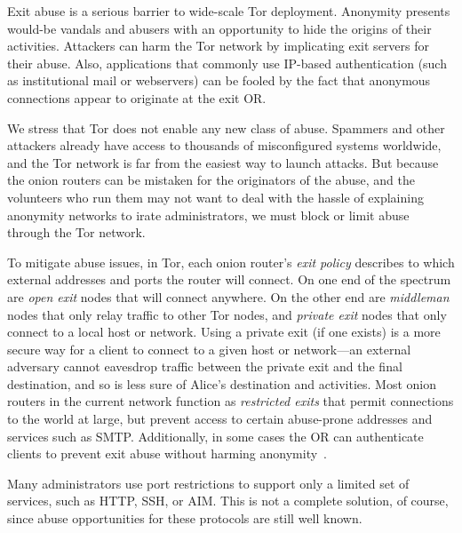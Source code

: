 \documentclass[twocolumn]{article}
\begin{document}
Exit abuse is a serious barrier to wide-scale Tor deployment. Anonymity
presents would-be vandals and abusers with an opportunity to hide
the origins of their activities. Attackers can harm the Tor network by
implicating exit servers for their abuse. Also, applications that commonly
use IP-based authentication (such as institutional mail or webservers)
can be fooled by the fact that anonymous connections appear to originate
at the exit OR.

We stress that Tor does not enable any new class of abuse. Spammers
and other attackers already have access to thousands of misconfigured
systems worldwide, and the Tor network is far from the easiest way
to launch attacks.
But because the
onion routers can be mistaken for the originators of the abuse,
and the volunteers who run them may not want to deal with the hassle of
explaining anonymity networks to irate administrators, we must block or limit
abuse through the Tor network.

To mitigate abuse issues, in Tor, each onion router's \emph{exit policy}
describes to which external addresses and ports the router will
connect. On one end of the spectrum are \emph{open exit}
nodes that will connect anywhere. On the other end are \emph{middleman}
nodes that only relay traffic to other Tor nodes, and \emph{private exit}
nodes that only connect to a local host or network.  Using a private
exit (if one exists) is a more secure way for a client to connect to a
given host or network---an external adversary cannot eavesdrop traffic
between the private exit and the final destination, and so is less sure of
Alice's destination and activities. Most onion routers in the current
network function as
\emph{restricted exits} that permit connections to the world at large,
but prevent access to certain abuse-prone addresses and services such
as SMTP.
Additionally, in some cases the OR can authenticate clients to
prevent exit abuse without harming anonymity~\cite{or-discex00}.


Many administrators use port restrictions to support only a
limited set of services, such as HTTP, SSH, or AIM.
This is not a complete solution, of course, since abuse opportunities for these
protocols are still well known.
\end{document}

